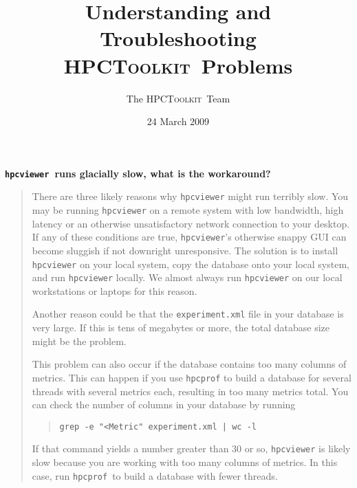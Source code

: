 \documentclass{article}
\newcommand{\hpctoolkit}{\textsc{HPCToolkit}}
\newcommand{\hpcprof}{\texttt{hpcprof}}
\newcommand{\hpcviewer}{\texttt{hpcviewer}}
\begin{document}
\title{Understanding and Troubleshooting \\
         \hpctoolkit\ Problems}
\author{The \hpctoolkit\ Team}
\date{24 March 2009}
\maketitle

\textbf{\hpcviewer\ runs glacially slow, what is the workaround?}
\begin{quote}
There are three likely reasons why \hpcviewer{} might run terribly
slow.  You may be running \hpcviewer{} on a remote system with low
bandwidth, high latency or an otherwise unsatisfactory network
connection to your desktop. If any of these conditions are true,
\hpcviewer{}'s otherwise snappy GUI can become sluggish if not
downright unresponsive.  The solution is to install \hpcviewer{} on
your local system, copy the database onto your local system, and run
\hpcviewer{} locally. We almost always run \hpcviewer{} on our local
workstations or laptops for this reason.

Another reason could be that the {\tt experiment.xml} file in your
database is very large.  If this is tens of megabytes or more, the
total database size might be the problem.

This problem can also occur if the database contains too many columns
of metrics.  This can happen if you use \hpcprof{} to build a database
for several threads with several metrics each, resulting in too many
metrics total. You can check the number of columns in your database by
running
\begin{quote}
\verb,grep -e "<Metric" experiment.xml | wc -l,
\end{quote}
If that command yields a number greater than 30 or so, \hpcviewer{} is
likely slow because you are working with too many columns of metrics.
In this case, run \hpcprof\ to build a database with fewer threads.
\end{quote}
\end{document}
